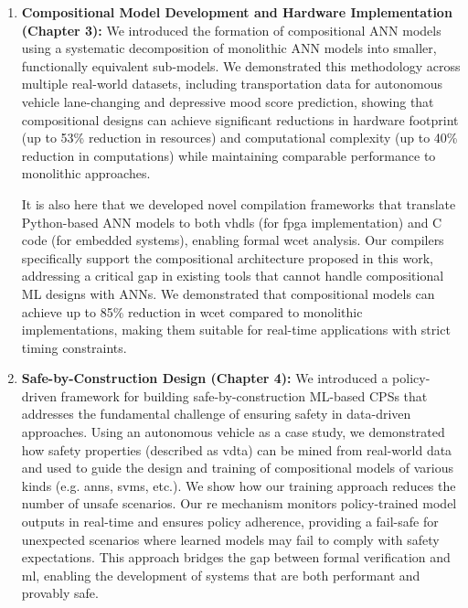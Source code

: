 \begin{enumerate}
    \item \textbf{Compositional Model Development and Hardware Implementation (Chapter 3):} We introduced the formation of compositional ANN models using a systematic decomposition of monolithic ANN models into smaller, functionally equivalent sub-models. We demonstrated this methodology across multiple real-world datasets, including transportation data for autonomous vehicle lane-changing and depressive mood score prediction, showing that compositional designs can achieve significant reductions in hardware footprint (up to 53\% reduction in resources) and computational complexity (up to 40\% reduction in computations) while maintaining comparable performance to monolithic approaches.

 It is also here that we developed novel compilation frameworks that translate Python-based ANN models to both \glspl{vhdl} (for \gls{fpga} implementation) and C code (for embedded systems), enabling formal \gls{wcet} analysis. Our compilers specifically support the compositional architecture proposed in this work, addressing a critical gap in existing tools that cannot handle compositional ML designs with ANNs. We demonstrated that compositional models can achieve up to 85\% reduction in \gls{wcet} compared to monolithic implementations, making them suitable for real-time applications with strict timing constraints.

    \item \textbf{Safe-by-Construction Design (Chapter 4):} We introduced a policy-driven framework for building safe-by-construction ML-based CPSs that addresses the fundamental challenge of ensuring safety in data-driven approaches. Using an autonomous vehicle as a case study, we demonstrated how safety properties (described as \gls{vdta}) can be mined from real-world data and used to guide the design and training of compositional models of various kinds (e.g. \glspl{ann}, \glspl{svm}, etc.). We show how our training approach reduces the number of unsafe scenarios. Our \gls{re} mechanism monitors policy-trained model outputs in real-time and ensures policy adherence, providing a fail-safe for unexpected scenarios where learned models may fail to comply with safety expectations. This approach bridges the gap between formal verification and \gls{ml}, enabling the development of systems that are both performant and provably safe.
    

\end{enumerate}
